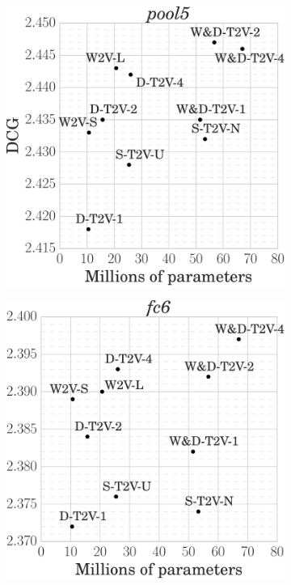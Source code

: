 \begin{figure}
\begin{subfigure}{.31\linewidth}
\includegraphics[width=\linewidth]{performance-size-pool5}
\end{subfigure}%
\hfill
\begin{subfigure}{.31\linewidth}
\includegraphics[width=\linewidth]{performance-size-fc6}

\end{subfigure}
\end{figure}
